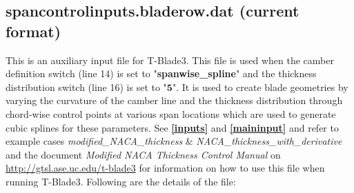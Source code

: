 \documentclass[8pt]{article}
\begin{document}
\subsection{spancontrolinputs.bladerow.dat (current format)}\label{auxinput_NACA}
\noindent
This is an auxiliary input file for T-Blade3. This file is used when the camber definition switch (line 14) is set to "\textbf{spanwise\_spline}" and the thickness distribution switch (line 16) is set to "$\mathbf{5}$". It is used to create blade geometries by varying the curvature of the camber line and the thickness distribution through chord-wise control points at various span locations which are used to generate cubic splines for these parameters. See \textbf{\ref{inputs}} and \textbf{\ref{maininput}} and refer to example cases \textit{modified\_NACA\_thickness} \& \textit{NACA\_thickness\_with\_derivative} and the document \textit{Modified NACA Thickness Control Manual} on \url{http://gtsl.ase.uc.edu/t-blade3} for information on how to use this file when running T-Blade3. Following are the details of the file:
\end{document}

